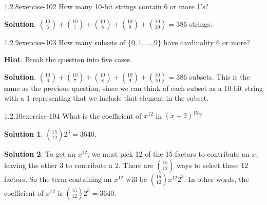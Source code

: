 \documentclass[twoside,11pt,]{book}
\numberwithin{equation}{chapter}
\begin{document}
\begin{divisionsolution}{1.2.8}{}{exercise-102}%
\hypertarget{p-1683}{}%
How many 10-bit strings contain 6 or more 1's?%
\par\smallskip%
\noindent\textbf{Solution}.\quad%
\hypertarget{p-1685}{}%
\({10 \choose 6} + {10\choose 7} + {10\choose 8} + {10 \choose 9} + {10\choose 10} = 386\) strings.%
\end{divisionsolution}%
\begin{divisionsolution}{1.2.9}{}{exercise-103}%
\hypertarget{p-1690}{}%
How many subsets of \(\{0,1,\ldots, 9\}\) have cardinality 6 or more?%
\par\smallskip%
\noindent\textbf{Hint}.\quad%
\hypertarget{p-1692}{}%
Break the question into five cases.%
\par\smallskip%
\noindent\textbf{Solution}.\quad%
\hypertarget{p-1693}{}%
\({10 \choose 6} + {10\choose 7} + {10\choose 8} + {10 \choose 9} + {10\choose 10} = 386\) subsets. This is the same as the previous question, since we can think of each subset as a 10-bit string with a 1 representing that we include that element in the subset.%
\end{divisionsolution}%
\begin{divisionsolution}{1.2.10}{}{exercise-104}%
\hypertarget{p-1698}{}%
What is the coefficient of \(x^{12}\) in \((x+2)^{15}\text{?}\)%
\par\smallskip%
\noindent\textbf{Solution 1}.\quad%
\hypertarget{p-1700}{}%
\({15\choose 12}2^3 = 3640\text{.}\)%
\par\smallskip%
\noindent\textbf{Solution 2}.\quad%
\hypertarget{p-1701}{}%
To get an \(x^{12}\text{,}\) we must pick 12 of the 15 factors to contribute an \(x\text{,}\) leaving the other 3 to contribute a 2. There are \({15 \choose 12}\) ways to select these 12 factors. So the term containing an \(x^{12}\) will be \({15 \choose 12}x^{12}2^{3}\text{.}\) In other words, the coefficient of \(x^{12}\) is \({15\choose 12}2^3 = 3640\text{.}\)%
\end{divisionsolution}%
\end{document}
